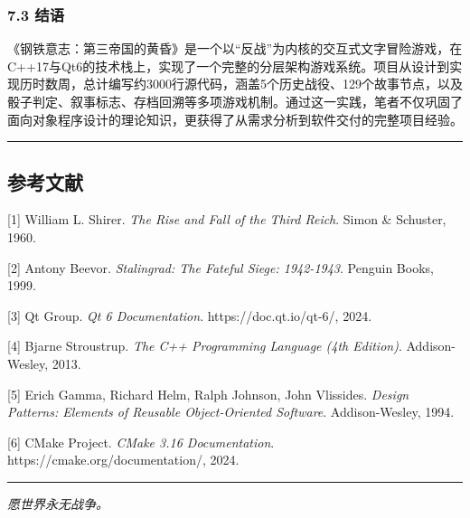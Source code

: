 \hypertarget{ux7ed3ux8bed}{%
\subsubsection{7.3 结语}\label{ux7ed3ux8bed}}

《钢铁意志：第三帝国的黄昏》是一个以``反战''为内核的交互式文字冒险游戏，在C++17与Qt6的技术栈上，实现了一个完整的分层架构游戏系统。项目从设计到实现历时数周，总计编写约3000行源代码，涵盖5个历史战役、129个故事节点，以及骰子判定、叙事标志、存档回溯等多项游戏机制。通过这一实践，笔者不仅巩固了面向对象程序设计的理论知识，更获得了从需求分析到软件交付的完整项目经验。

\begin{center}\rule{0.5\linewidth}{0.5pt}\end{center}

\hypertarget{ux53c2ux8003ux6587ux732e}{%
\subsection{参考文献}\label{ux53c2ux8003ux6587ux732e}}

{[}1{]} William L. Shirer. \emph{The Rise and Fall of the Third Reich}.
Simon \& Schuster, 1960.

{[}2{]} Antony Beevor. \emph{Stalingrad: The Fateful Siege: 1942-1943}.
Penguin Books, 1999.

{[}3{]} Qt Group. \emph{Qt 6 Documentation}. https://doc.qt.io/qt-6/,
2024.

{[}4{]} Bjarne Stroustrup. \emph{The C++ Programming Language (4th
Edition)}. Addison-Wesley, 2013.

{[}5{]} Erich Gamma, Richard Helm, Ralph Johnson, John Vlissides.
\emph{Design Patterns: Elements of Reusable Object-Oriented Software}.
Addison-Wesley, 1994.

{[}6{]} CMake Project. \emph{CMake 3.16 Documentation}.
https://cmake.org/documentation/, 2024.

\begin{center}\rule{0.5\linewidth}{0.5pt}\end{center}

\emph{愿世界永无战争。}
